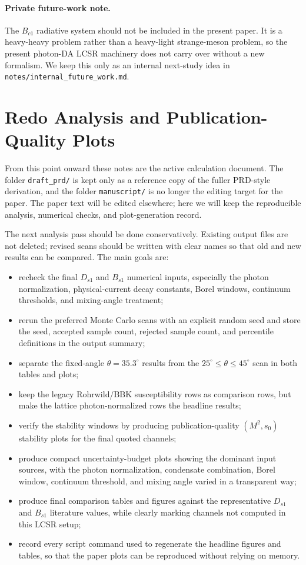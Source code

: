 \documentclass[11pt]{article}
\begin{document}
\paragraph{Private future-work note.}
The $B_{c1}$ radiative system should not be included in the present paper.
It is a heavy-heavy problem rather than a heavy-light strange-meson problem, so
the present photon-DA LCSR machinery does not carry over without a new
formalism.  We keep this only as an internal next-study idea in
\texttt{notes/internal\_future\_work.md}.

\section{Redo Analysis and Publication-Quality Plots}
\label{sec:redo-analysis-publication-plots}

From this point onward these notes are the active calculation document.  The
folder \texttt{draft\_prd/} is kept only as a reference copy of the fuller
PRD-style derivation, and the folder \texttt{manuscript/} is no longer the
editing target for the paper.  The paper text will be edited elsewhere; here we
will keep the reproducible analysis, numerical checks, and plot-generation
record.

The next analysis pass should be done conservatively.  Existing output files are
not deleted; revised scans should be written with clear names so that old and
new results can be compared.  The main goals are:
\begin{itemize}
  \item recheck the final $D_{s1}$ and $B_{s1}$ numerical inputs, especially
  the photon normalization, physical-current decay constants, Borel windows,
  continuum thresholds, and mixing-angle treatment;
  \item rerun the preferred Monte Carlo scans with an explicit random seed and
  store the seed, accepted sample count, rejected sample count, and percentile
  definitions in the output summary;
  \item separate the fixed-angle $\theta=35.3^\circ$ results from the
  $25^\circ\leq\theta\leq45^\circ$ scan in both tables and plots;
  \item keep the legacy Rohrwild/BBK susceptibility rows as comparison rows, but
  make the lattice photon-normalized rows the headline results;
  \item verify the stability windows by producing publication-quality
  $(M^2,s_0)$ stability plots for the final quoted channels;
  \item produce compact uncertainty-budget plots showing the dominant input
  sources, with the photon normalization, condensate combination, Borel window,
  continuum threshold, and mixing angle varied in a transparent way;
  \item produce final comparison tables and figures against the representative
  $D_{s1}$ and $B_{s1}$ literature values, while clearly marking channels not
  computed in this LCSR setup;
  \item record every script command used to regenerate the headline figures and
  tables, so that the paper plots can be reproduced without relying on memory.
\end{itemize}
\end{document}
